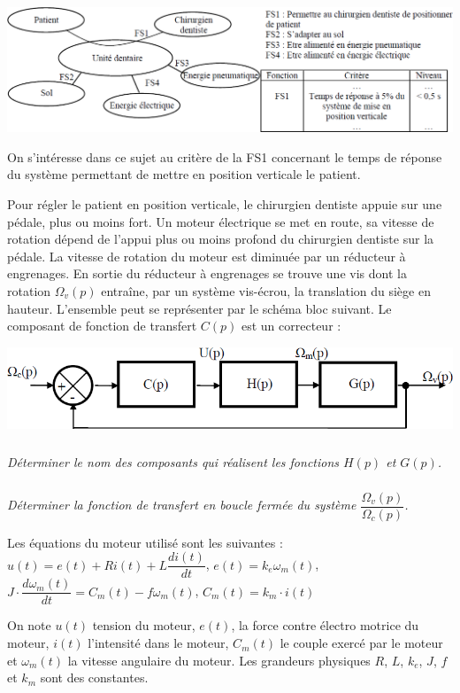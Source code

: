 \documentclass[10pt,fleqn]{article} %
\begin{document}
\begin{multicols}{2}
\begin{center}
\includegraphics[width=.9\linewidth]{images/fig4_2}
\end{center}

On s'intéresse dans ce sujet au critère de la FS1 concernant le temps de réponse du système permettant de mettre en position verticale le patient. 

Pour régler le patient en position verticale, le chirurgien dentiste appuie sur une pédale, plus ou moins fort. Un moteur électrique se met en route, sa vitesse de rotation dépend de l'appui plus ou moins profond du chirurgien dentiste sur la pédale. La vitesse de rotation du moteur est diminuée par un réducteur à engrenages. En sortie du réducteur à engrenages se trouve une vis dont la rotation $\Omega_v(p)$ entraîne, par un système vis-écrou, la translation du siège en hauteur. L'ensemble peut se représenter par le schéma bloc suivant. Le composant de fonction de transfert $C(p)$ est un correcteur :


\begin{center}
\includegraphics[width=\linewidth]{images/fig3}
\end{center}

\subparagraph{}
\textit{Déterminer le nom des composants qui réalisent les fonctions $H(p)$ et $G(p)$.}

\subparagraph{}
\textit{Déterminer la fonction de transfert en boucle fermée du système $\dfrac{\Omega_v(p)}{\Omega_c(p)}$.}

Les équations du moteur utilisé sont les suivantes : $u(t)=e(t)+Ri(t)+L\dfrac{di(t)}{dt}$, $e(t) = k_e \omega_m(t)$, $ J\cdot\dfrac{d\omega_m(t)}{dt} = C_m(t)-f\omega_m(t)$, $ C_m(t)=k_m \cdot i(t)
$

On note $u(t)$ tension du moteur, $e(t)$, la force contre électro motrice du moteur, $i(t)$ l'intensité dans le moteur, $C_m(t)$ le couple exercé par le moteur et $\omega_m(t)$ la vitesse angulaire du moteur. Les grandeurs physiques $R$, $L$, $k_e$, $J$, $f$ et $k_m$ sont des constantes.


\end{multicols}
\end{document}
